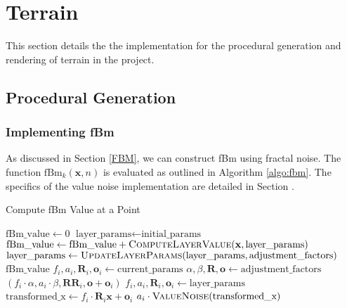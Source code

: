 \section{Terrain}
\label{Terrain}

This section details the the implementation for the procedural generation and rendering of terrain in the project.

\subsection{Procedural Generation}
\label{Terrain Procedural Generation}

\subsubsection{Implementing fBm}
\label{Implement fbm}

As discussed in Section \ref{FBM}, we can construct fBm using fractal noise. The function $\text{fBm}_k(\mathbf{x}, n)$ is evaluated as outlined in Algorithm \ref{algo:fbm}. The specifics of the value noise implementation are detailed in Section .

\begin{algorithm}
\caption{Compute fBm Value at a Point}
\label{algo:fbm}
\begin{algorithmic}[1]
    \State $\text{fBm\_value} \gets 0$
    \State $\text{layer\_params} \gets \text{initial\_params}$
        \State $\text{fBm\_value} \gets \text{fBm\_value} + \Call{ComputeLayerValue}{\mathbf{x}, \text{layer\_params}}$
        \State $\text{layer\_params} \gets \Call{UpdateLayerParams}{\text{layer\_params}, \text{adjustment\_factors}}$
    \EndFor
    \State \Return $\text{fBm\_value}$
\EndFunction
\Statex
{}
    \State $f_i, a_i, \mathbf{R}_i, \mathbf{o}_i \gets \text{current\_params}$
    \State $\alpha, \beta, \mathbf{R}, \mathbf{o} \gets \text{adjustment\_factors}$
    \State \Return $(f_i \cdot \alpha, a_i \cdot \beta, \mathbf{R} \mathbf{R}_i, \mathbf{o} + \mathbf{o}_i)$
\EndFunction
\Statex
{}
    \State $f_i, a_i, \mathbf{R}_i, \mathbf{o}_i \gets \text{layer\_params}$
    \State $\text{transformed\_x} \gets f_i \cdot \mathbf{R}_i \textbf{x} + \mathbf{o}_i$
    \State \Return $a_i \cdot \Call{ValueNoise}{\text{transformed\_x}}$
\EndFunction
\end{algorithmic}
\end{algorithm}

